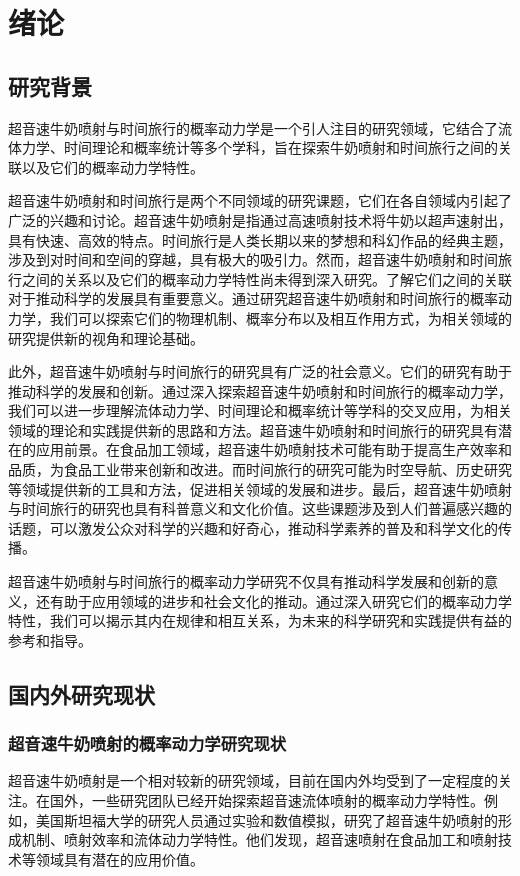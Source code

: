 \chapter{绪论}


\section{研究背景}
超音速牛奶喷射与时间旅行的概率动力学是一个引人注目的研究领域，它结合了流体力学、时间理论和概率统计等多个学科，旨在探索牛奶喷射和时间旅行之间的关联以及它们的概率动力学特性。

超音速牛奶喷射和时间旅行是两个不同领域的研究课题，它们在各自领域内引起了广泛的兴趣和讨论。超音速牛奶喷射是指通过高速喷射技术将牛奶以超声速射出，具有快速、高效的特点。时间旅行是人类长期以来的梦想和科幻作品的经典主题，涉及到对时间和空间的穿越，具有极大的吸引力。然而，超音速牛奶喷射和时间旅行之间的关系以及它们的概率动力学特性尚未得到深入研究。了解它们之间的关联对于推动科学的发展具有重要意义。通过研究超音速牛奶喷射和时间旅行的概率动力学，我们可以探索它们的物理机制、概率分布以及相互作用方式，为相关领域的研究提供新的视角和理论基础。

此外，超音速牛奶喷射与时间旅行的研究具有广泛的社会意义。它们的研究有助于推动科学的发展和创新。通过深入探索超音速牛奶喷射和时间旅行的概率动力学，我们可以进一步理解流体动力学、时间理论和概率统计等学科的交叉应用，为相关领域的理论和实践提供新的思路和方法。超音速牛奶喷射和时间旅行的研究具有潜在的应用前景。在食品加工领域，超音速牛奶喷射技术可能有助于提高生产效率和品质，为食品工业带来创新和改进。而时间旅行的研究可能为时空导航、历史研究等领域提供新的工具和方法，促进相关领域的发展和进步。最后，超音速牛奶喷射与时间旅行的研究也具有科普意义和文化价值。这些课题涉及到人们普遍感兴趣的话题，可以激发公众对科学的兴趣和好奇心，推动科学素养的普及和科学文化的传播。

超音速牛奶喷射与时间旅行的概率动力学研究不仅具有推动科学发展和创新的意义，还有助于应用领域的进步和社会文化的推动。通过深入研究它们的概率动力学特性，我们可以揭示其内在规律和相互关系，为未来的科学研究和实践提供有益的参考和指导。


\section{国内外研究现状}
\subsection{超音速牛奶喷射的概率动力学研究现状}
超音速牛奶喷射是一个相对较新的研究领域，目前在国内外均受到了一定程度的关注。在国外，一些研究团队已经开始探索超音速流体喷射的概率动力学特性。例如，美国斯坦福大学的研究人员通过实验和数值模拟，研究了超音速牛奶喷射的形成机制、喷射效率和流体动力学特性。他们发现，超音速喷射在食品加工和喷射技术等领域具有潜在的应用价值。

